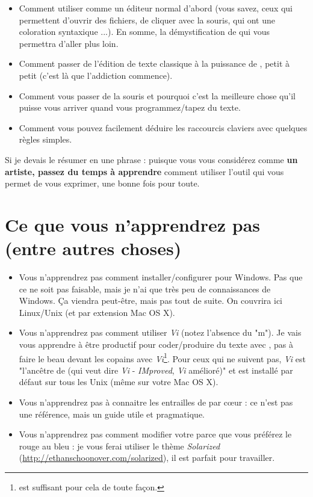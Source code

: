 \begin{itemize}
    \item Comment utiliser \vim comme un éditeur \og normal \fg{} d'abord (vous savez, ceux qui permettent d'ouvrir des fichiers, de cliquer avec la souris, qui ont une coloration syntaxique ...). En somme, la démystification de \vim qui vous permettra d'aller plus loin.
    \item Comment passer de l'édition de texte classique à la puissance de \vim, petit à petit (c'est là que l'addiction commence).
    \item Comment vous passer de la souris et pourquoi c'est la meilleure chose qu'il puisse vous arriver quand vous programmez/tapez du texte.
    \item Comment vous pouvez facilement déduire les raccourcis claviers avec quelques règles simples.
\end{itemize}

Si je devais le résumer en une phrase : puisque vous vous considérez comme {\bf un artiste, passez du temps à apprendre} comment utiliser l'outil qui vous permet de vous exprimer, une bonne fois pour toute.

\section{Ce que vous n'apprendrez pas (entre autres choses)}

\begin{itemize}
    \item Vous n'apprendrez pas comment installer/configurer \vim pour Windows. Pas que ce ne soit pas faisable, mais je n'ai que très peu de connaissances de Windows. Ça viendra peut-être, mais pas tout de suite. On couvrira ici Linux/Unix (et par extension Mac OS X).
    \item Vous n'apprendrez pas comment utiliser \emph{Vi} (notez l'absence du "m"). Je vais vous apprendre à être productif pour coder/produire du texte avec \vim, pas à faire le beau devant les copains avec \emph{Vi}\footnote{\vim est suffisant pour cela de toute façon.}. Pour ceux qui ne suivent pas, \emph{Vi} est "l'ancêtre de \vim (qui veut dire \emph{Vi} - \emph{IMproved}, \emph{Vi} amélioré)" et est installé par défaut sur tous les Unix (même sur votre Mac OS X).
    \item Vous n'apprendrez pas à connaitre les entrailles de \vim par c\oe ur : ce n'est pas une référence, mais un guide utile et pragmatique.
    \item Vous n'apprendrez pas comment modifier votre \vim parce que vous préférez le rouge au bleu : je vous ferai utiliser le thème \emph{Solarized} (\url{http://ethanschoonover.com/solarized}), il est parfait pour travailler.
\end{itemize}

